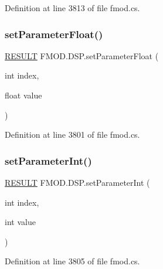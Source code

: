 Definition at line 3813 of file fmod.\+cs.

\mbox{\label{class_f_m_o_d_1_1_d_s_p_aaa3b811b9eaf31dad15e695cf2770645}} 
\subsubsection{\texorpdfstring{set\+Parameter\+Float()}{setParameterFloat()}}
{\footnotesize\ttfamily \hyperlink{namespace_f_m_o_d_a305d1176ef3f8c8815861a60407ac33d}{R\+E\+S\+U\+LT} F\+M\+O\+D.\+D\+S\+P.\+set\+Parameter\+Float (\begin{DoxyParamCaption}\item[{int}]{index,  }\item[{float}]{value }\end{DoxyParamCaption})}



Definition at line 3801 of file fmod.\+cs.

\mbox{\label{class_f_m_o_d_1_1_d_s_p_a8d8a5a568001f1df253d1842393187ac}} 
\subsubsection{\texorpdfstring{set\+Parameter\+Int()}{setParameterInt()}}
{\footnotesize\ttfamily \hyperlink{namespace_f_m_o_d_a305d1176ef3f8c8815861a60407ac33d}{R\+E\+S\+U\+LT} F\+M\+O\+D.\+D\+S\+P.\+set\+Parameter\+Int (\begin{DoxyParamCaption}\item[{int}]{index,  }\item[{int}]{value }\end{DoxyParamCaption})}



Definition at line 3805 of file fmod.\+cs.

\mbox{\label{class_f_m_o_d_1_1_d_s_p_a9d1f48a083751c222998aeaaf1ea7c60}} 
